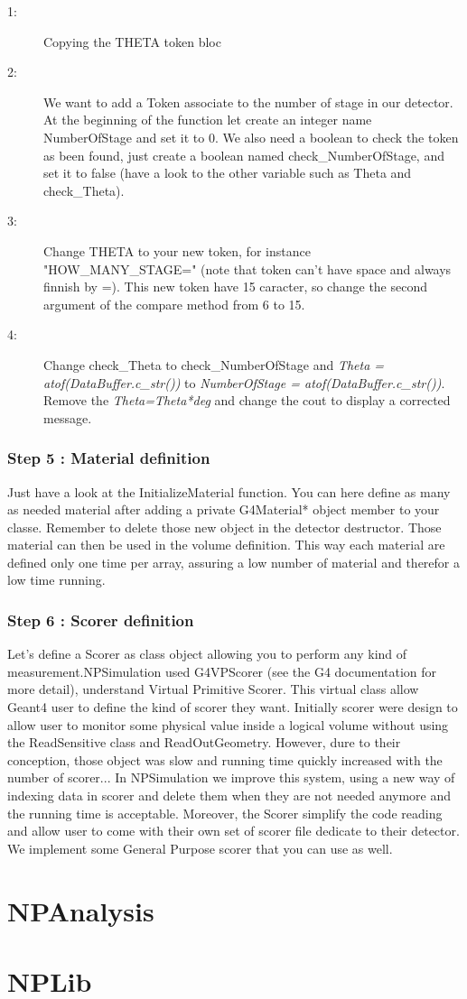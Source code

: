 \documentclass{book}
\begin{document}
		\begin{description}
			\item[1:] Copying the THETA token bloc
			\item[2:] We want to add a Token associate to the number of stage in our detector. At the beginning of the function let create an integer name NumberOfStage and set it to 0. We also need a boolean to check the token as been found, just create a boolean named check\_NumberOfStage, and set it to false (have a look to the other variable such as Theta and check\_Theta).
			\item[3:] Change THETA to your new token, for instance "HOW\_MANY\_STAGE=" (note that token can't have space and always finnish by =). This new token have 15 caracter, so change the second argument of the compare method from 6 to 15.
			\item[4:] Change check\_Theta to check\_NumberOfStage and \emph{Theta = atof(DataBuffer.c\_str())} to \emph{NumberOfStage = atof(DataBuffer.c\_str())}. Remove the \emph{Theta=Theta*deg} and change the cout to display a corrected message.
		\end{description}

		
		\subsection{Step 5 : Material definition}

		Just have a look at the InitializeMaterial function. You can here define as many as needed material after adding a private G4Material* object member to your classe. Remember to delete those new object in the detector destructor. Those material can then be used in the volume definition. This way each material are defined only one time per array, assuring a low number of material and therefor a low time running.

		\subsection{Step 6 : Scorer definition}
	
	Let's define a Scorer as class object allowing you to perform any kind of measurement.NPSimulation used G4VPScorer (see the G4 documentation for more detail), understand Virtual Primitive Scorer. This virtual class allow Geant4 user to define the kind of scorer they want. Initially scorer were design to allow user to monitor some physical value inside a logical volume without using the ReadSensitive class and ReadOutGeometry. However, dure to their conception, those object was slow and running time quickly increased with the number of scorer... In NPSimulation we improve this system, using a new way of indexing data in scorer and delete them when they are not needed anymore and the running time is acceptable. Moreover, the Scorer simplify the code reading and allow user to come with their own set of scorer file dedicate to their detector. We implement some General Purpose scorer that you can use as well.

\chapter[NPAnalysis]{NPAnalysis}

\chapter[NPLib]{NPLib}
\end{document}
